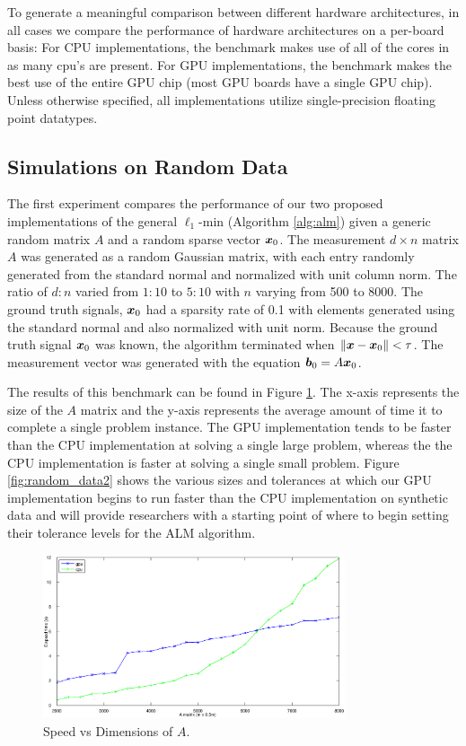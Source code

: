 \documentclass[10pt,twocolumn,letterpaper]{article}
\begin{document}
To generate a meaningful comparison between different hardware architectures,
in all cases we compare the performance of hardware architectures on a
per-board basis:  For CPU implementations, the benchmark makes use of all of
the cores in as many cpu's are present.  For GPU implementations, the benchmark
makes the best use of the entire GPU chip (most GPU boards have a single GPU
chip).  Unless otherwise specified, all implementations utilize single-precision 
floating point datatypes.  

\subsection{Simulations on Random Data}
\label{sec:simulation}

The first experiment compares the performance of our two proposed
implementations of the general $\ell_1$-min (Algorithm \eqref{alg:alm}) given a
generic random matrix $A$ and a random sparse vector ${\boldsymbol{x}}_0$.  The measurement
$d \times n$ matrix $A$ was generated as a random Gaussian matrix, with each
entry randomly generated from the standard normal and normalized with unit
column norm.  The ratio of $d:n$ varied from $1:10$ to $5:10$ with $n$ varying
from 500 to 8000.  The ground truth signals, ${\boldsymbol{x}}_0$ had a sparsity rate of 0.1
with elements generated using the standard normal and also normalized with unit
norm.  Because the ground truth signal ${\boldsymbol{x}}_0$ was known, the algorithm
terminated when $\|{\boldsymbol x}-{\boldsymbol x}_0\| < \tau$.  The measurement vector was generated
with the equation ${\boldsymbol{b}}_0 = A {\boldsymbol{x}}_0$.   

The results of this benchmark can be found in Figure \ref{fig:random_data}.
The x-axis represents the size of the $A$ matrix and the y-axis represents the
average amount of time it to complete a single problem instance.  The GPU
implementation tends to be faster than the CPU implementation at solving a
single large problem, whereas the the CPU implementation is faster at solving a
single small problem.  Figure \ref{fig:random_data2} shows the various sizes
and tolerances at which our GPU implementation begins to run faster than the
CPU implementation on synthetic data and will provide researchers with a
starting point of where to begin setting their tolerance levels for the ALM
algorithm.
\begin{figure}
\begin{center}
\includegraphics[width=3.5in]{results/random_data/time_vs_matrix_size_constant_tol}
\end{center}
\caption{Speed vs Dimensions of $A$.}
\label{fig:random_data}
\end{figure}
\end{document}
